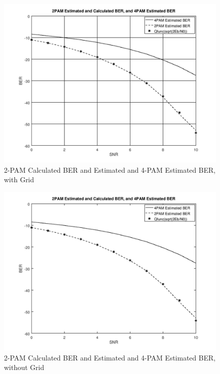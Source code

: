 \documentclass{article}
\begin{document}
\begin{figure}
        \centering 	\includegraphics[width=\linewidth]{2pam2pam4pam.jpg}
    \caption{2-PAM Calculated BER and Estimated and 4-PAM Estimated BER, with Grid}
\end{figure}
\begin{figure}
        \centering 	\includegraphics[width=\linewidth]{2pam2pam4pam_nogrid.jpg}
    \caption{2-PAM Calculated BER and Estimated and 4-PAM Estimated BER, without Grid}
\end{figure}
\end{document}
